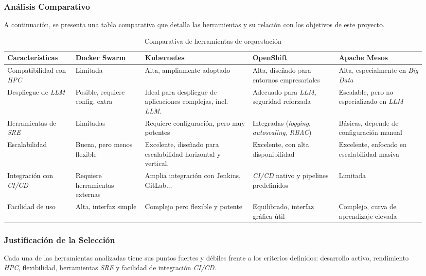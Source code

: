 \newpage
\subsubsection*{Análisis Comparativo}
A continuación, se presenta una tabla comparativa que detalla las herramientas y su relación con los objetivos de este proyecto.
\begin{table}[H]
\centering
\begin{tabular}{|p{3.5cm}|p{2.5cm}|p{2.5cm}|p{2.5cm}|p{2.5cm}|}
\hline
\textbf{Características} & \textbf{Docker Swarm} & \textbf{Kubernetes} & \textbf{OpenShift} & \textbf{Apache Mesos} \\
\hline
Compatibilidad con \textit{HPC} & Limitada & Alta, ampliamente adoptado & Alta, diseñado para entornos empresariales & Alta, especialmente en \textit{Big Data} \\
\hline
Despliegue de \textit{LLM} & Posible, requiere config. extra & Ideal para despliegue de aplicaciones complejas, incl. \textit{LLM}. & Adecuado para \textit{LLM}, seguridad reforzada & Escalable, pero no especializado en \textit{LLM} \\
\hline
Herramientas de \textit{SRE} & Limitadas & Requiere configuración, pero muy potentes & Integradas (\textit{logging}, \textit{autoscaling}, \textit{RBAC}) & Básicas, depende de configuración manual \\
\hline
Escalabilidad & Buena, pero menos flexible & Excelente, diseñado para escalabilidad horizontal y vertical. & Excelente, con alta disponibilidad & Excelente, enfocado en escalabilidad masiva \\
\hline
Integración con \textit{CI/CD} & Requiere herramientas externas & Amplia integración con Jenkins, GitLab... & \textit{CI/CD} nativo y pipelines predefinidos & Limitada \\
\hline
Facilidad de uso & Alta, interfaz simple & Complejo pero flexible y potente & Equilibrado, interfaz gráfica útil & Complejo, curva de aprendizaje elevada \\
\hline
\end{tabular}
\captionsetup{justification=centering}
\caption{Comparativa de herramientas de orquestación}
\label{tab:comparativa_orquestacion}
\end{table}

\newpage
\subsubsection*{Justificación de la Selección}
Cada una de las herramientas analizadas tiene sus puntos fuertes y débiles frente a los criterios definidos: desarrollo activo, rendimiento \textit{HPC}, flexibilidad, herramientas \textit{SRE} y facilidad de integración \textit{CI/CD}.

